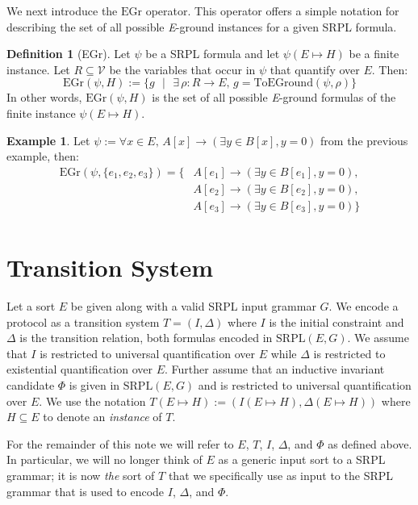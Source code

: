 \documentclass[12pt]{article}
\theoremstyle{definition}
\newtheorem{definition}{Definition}
\newtheorem{example}{Example}
\theoremstyle{remark}
\newcommand{\st}{\text{ }|\text{ }}
\newcommand{\gr}{\text{EGr}}
\newcommand{\SRPL}{\text{SRPL}}
\newcommand{\toground}{\text{ToEGround}}
\begin{document}
We next introduce the $\gr$ operator.  This operator offers a simple notation for describing the set of all possible \textit{E}-ground instances for a given SRPL formula.

\begin{definition}[EGr]
  Let $\psi$ be a SRPL formula and let $\psi(E \mapsto H)$ be a finite instance.  Let $R \subseteq \mathcal{V}$ be the variables that occur in $\psi$ that quantify over $E$.  Then:
  $$\gr(\psi,H) := \{g \st \exists \, \rho : R \to E, \, g = \toground(\psi,\rho)\}$$
  In other words, $\gr(\psi,H)$ is the set of all possible \textit{E}-ground formulas of the finite instance $\psi(E \mapsto H)$.
\end{definition}

\begin{example}
  Let $\psi := \forall x \in E, \, A[x] \rightarrow (\exists y \in B[x], y = 0)$ from the previous example, then:
  \begin{align*}
    \gr(\psi,\{e_1,e_2,e_3\}) = \{&A[e_1] \rightarrow (\exists y \in B[e_1], y = 0),\\
    &A[e_2] \rightarrow (\exists y \in B[e_2], y = 0),\\
    &A[e_3] \rightarrow (\exists y \in B[e_3], y = 0)\}\\
  \end{align*}
\end{example}



\section{Transition System}

Let a sort $E$ be given along with a valid SRPL input grammar $G$.  We encode a protocol as a transition system $T=(I,\Delta)$ where $I$ is the initial constraint and $\Delta$ is the transition relation, both formulas encoded in $\SRPL(E,G)$.  We assume that $I$ is restricted to universal quantification over $E$ while $\Delta$ is restricted to existential quantification over $E$.  Further assume that an inductive invariant candidate $\Phi$ is given in $\SRPL(E,G)$ and is restricted to universal quantification over $E$.  We use the notation $T(E \mapsto H):=(I(E \mapsto H),\Delta(E \mapsto H))$ where $H \subseteq E$ to denote an \textit{instance} of $T$.

For the remainder of this note we will refer to $E$, $T$, $I$, $\Delta$, and $\Phi$ as defined above.  In particular, we will no longer think of $E$ as a generic input sort to a SRPL grammar; it is now \textit{the} sort of $T$ that we specifically use as input to the SRPL grammar that is used to encode $I$, $\Delta$, and $\Phi$.
\end{document}
